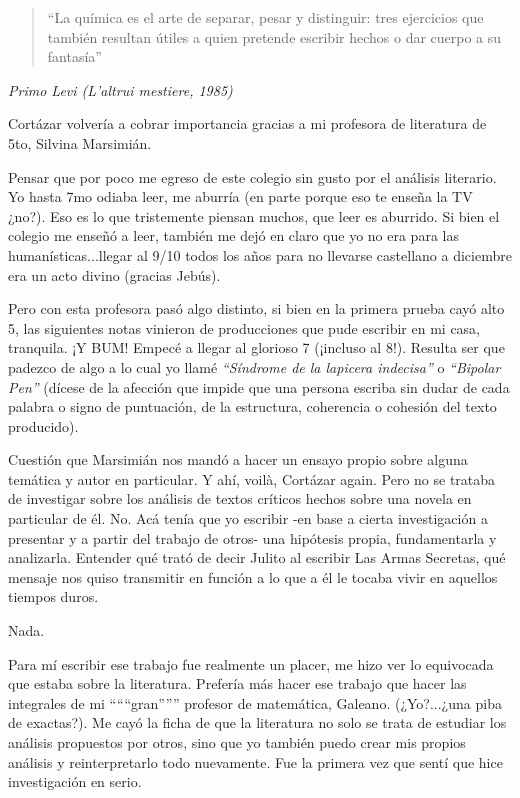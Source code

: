\documentclass[16pt, a4 paper]{article}
\begin{document}
\begin{quote}
“La qu\'imica es el arte de separar, pesar y distinguir: 
tres ejercicios que tambi\'en resultan \'utiles a quien pretende escribir hechos 
o dar cuerpo a su fantas\'ia” 
\end{quote}

\begin{flushright}
\textit {Primo Levi (L'altrui mestiere, 1985)} 
\end{flushright}

Cort\'azar volver\'ia a cobrar importancia gracias a mi profesora de literatura de 5to, Silvina Marsimi\'an. 

Pensar que por poco me egreso de este colegio sin gusto por el an\'alisis literario. Yo hasta 7mo odiaba leer, me aburr\'ia (en parte porque eso te ense\~na la TV ¿no?). Eso es lo que tristemente piensan muchos, que leer es aburrido. Si bien el colegio me ense\~n\'o a leer, tambi\'en me dej\'o en claro que yo no era para las human\'isticas...llegar al 9/10 todos los a\~nos para no llevarse castellano a diciembre era un acto divino (gracias Jeb\'us). 

Pero con esta profesora pas\'o algo distinto, si bien en la primera prueba cay\'o alto 5, las siguientes notas vinieron de producciones que pude escribir en mi casa, tranquila. ¡Y BUM! Empec\'e a llegar al glorioso 7 (¡incluso al 8!). Resulta ser que padezco de algo a lo cual yo llam\'e \textit {“S\'indrome de la lapicera indecisa”} o \textit {“Bipolar Pen”} (d\'icese de la afecci\'on que impide que una persona escriba sin dudar de cada palabra o signo de puntuaci\'on, de la estructura, coherencia o cohesi\'on del texto producido).

Cuesti\'on que Marsimi\'an nos mand\'o a hacer un ensayo propio sobre alguna tem\'atica y autor en particular. Y ah\'i, voilà, Cort\'azar again. Pero no se trataba de investigar sobre los an\'alisis de textos cr\'iticos hechos sobre una novela en particular de \'el. No. Ac\'a ten\'ia que yo escribir -en base a cierta investigaci\'on a presentar y a partir del trabajo de otros- una hip\'otesis propia, fundamentarla y analizarla. Entender qu\'e trat\'o de decir Julito al escribir Las Armas Secretas, qu\'e mensaje nos quiso transmitir en funci\'on a lo que a \'el le tocaba vivir en aquellos tiempos duros.

Nada.

Para m\'i escribir ese trabajo fue realmente un placer, me hizo ver lo equivocada que estaba sobre la literatura. Prefer\'ia m\'as hacer ese trabajo que hacer las integrales de mi “““gran””” profesor de matem\'atica, Galeano. (¿Yo?...¿una piba de exactas?). Me cay\'o la ficha de que la literatura no solo se trata de estudiar los an\'alisis propuestos por otros, sino que yo tambi\'en puedo crear mis propios an\'alisis y reinterpretarlo todo nuevamente. Fue la primera vez que sent\'i que hice investigaci\'on en serio. 
\end{document}
